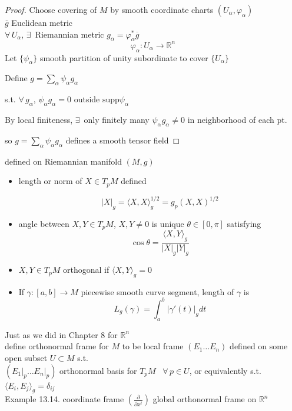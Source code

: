 \begin{proof}
Choose covering of $M$ by smooth coordinate charts $(U_{\alpha}, \varphi_{\alpha})$ \\
$\overline{g}$ Euclidean metric \\
$\forall \, U_{\alpha}$, $\exists \, $ Riemannian metric $g_{\alpha} = \varphi_{\alpha}^* \overline{g}$ 
\[
\varphi_{\alpha} : U_{\alpha} \to \mathbb{R}^n
\]
Let $\lbrace \psi_{\alpha} \rbrace$ smooth partition of unity subordinate to cover $\lbrace U_{\alpha} \rbrace$

Define $g= \sum_{\alpha} \psi_{\alpha} g_{\alpha}$

s.t. $\forall \, g_{\alpha}$, $\psi_{\alpha} g_{\alpha} = 0$ outside $\text{supp}{\psi_{\alpha}}$

By local finiteness, $\exists \, $ only finitely many $\psi_{\alpha} g_{\alpha} \neq 0$ in neighborhood of each pt. 

so $g= \sum_{\alpha} \psi_{\alpha} g_{\alpha}$ defines a smooth tensor field


\end{proof}


defined on Riemannian manifold $(M,g)$

\begin{itemize}
  \item length or norm of $X \in T_pM$ defined

\[
|X|_g = \langle X, X \rangle_g^{1/2} = g_p(X,X)^{1/2}
\]
\item angle between $X,Y \in T_pM$, $X,Y \neq 0$ is unique $\theta \in [0,\pi]$ satisfying 
\[
\cos{\theta} = \frac{ \langle X,Y \rangle_g }{ |X|_g |Y|_g}
\]
\item $X,Y \in T_pM$ orthogonal if $\langle X,Y\rangle_g = 0$
\item If $\gamma:[a,b] \to M$ piecewise smooth curve segment, length of $\gamma$ is 
\[
L_g(\gamma) = \int_a^b |\gamma'(t)|_g dt
\]
\end{itemize}

Just as we did in Chapter 8 for $\mathbb{R}^n$ \\ 
\quad define orthonormal frame for $M$ to be local frame $(E_1 \dots E_n)$ defined on some open subset $U \subset M$ s.t. \\
\quad \quad $( \left. E_1 \right|_p \dots \left. E_n \right|_p )$ orthonormal basis for $T_pM$ \quad \, $\forall \, p \in U$, or equivalently s.t. $\langle E_i, E_j \rangle_g = \delta_{ij}$ \\

Example 13.14.  coordinate frame $\left( \frac{ \partial }{ \partial x^i} \right)$ global orthonormal frame on $\mathbb{R}^n$

